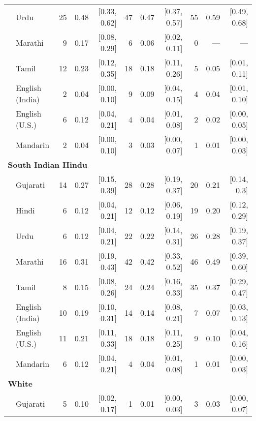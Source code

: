 \begin{table}[t]
\begin{footnotesize}
\begin{tabular}{p{.1in}lrrrrrrrrr}
 & Urdu & 25 & 0.48 & [0.33, 0.62] & 47 & 0.47 & [0.37, 0.57] & 55 & 0.59 & [0.49, 0.68]\\

 & Marathi & 9 & 0.17 & [0.08, 0.29] & 6 & 0.06 & [0.02, 0.11] & 0 & --- & ---\\

 & Tamil & 12 & 0.23 & [0.12, 0.35] & 18 & 0.18 & [0.11, 0.26] & 5 & 0.05 & [0.01, 0.11]\\

 & English (India) & 2 & 0.04 & [0.00, 0.10] & 9 & 0.09 & [0.04, 0.15] & 4 & 0.04 & [0.01, 0.10]\\

 & English (U.S.) & 6 & 0.12 & [0.04, 0.21] & 4 & 0.04 & [0.01, 0.08] & 2 & 0.02 & [0.00, 0.05]\\

& Mandarin & 2 & 0.04 & [0.00, 0.10] & 3 & 0.03 & [0.00, 0.07] & 1 & 0.01 & [0.00, 0.03]\\
\midrule
\multicolumn{11}{l}{\textbf{South Indian Hindu}}\\
& Gujarati & 14 & 0.27 & [0.15, 0.39] & 28 & 0.28 & [0.19, 0.37] & 20 & 0.21 & [0.14, 0.3]\\

 & Hindi & 6 & 0.12 & [0.04, 0.21] & 12 & 0.12 & [0.06, 0.19] & 19 & 0.20 & [0.12, 0.29]\\

 & Urdu & 6 & 0.12 & [0.04, 0.21] & 22 & 0.22 & [0.14, 0.31] & 26 & 0.28 & [0.19, 0.37]\\

 & Marathi & 16 & 0.31 & [0.19, 0.43] & 42 & 0.42 & [0.33, 0.52] & 46 & 0.49 & [0.39, 0.60]\\

 & Tamil & 8 & 0.15 & [0.08, 0.26] & 24 & 0.24 & [0.16, 0.33] & 35 & 0.37 & [0.29, 0.47]\\

 & English (India) & 10 & 0.19 & [0.10, 0.31] & 14 & 0.14 & [0.08, 0.21] & 7 & 0.07 & [0.03, 0.13]\\

 & English (U.S.) & 11 & 0.21 & [0.11, 0.33] & 18 & 0.18 & [0.11, 0.25] & 9 & 0.10 & [0.04, 0.16]\\

& Mandarin & 6 & 0.12 & [0.04, 0.21] & 4 & 0.04 & [0.01, 0.08] & 1 & 0.01 & [0.00, 0.03]\\
\midrule
\multicolumn{11}{l}{\textbf{White}}\\
 & Gujarati & 5 & 0.10 & [0.02, 0.17] & 1 & 0.01 & [0.00, 0.03] & 3 & 0.03 & [0.00, 0.07]\\


\end{tabular}
\end{footnotesize}
\end{table}
